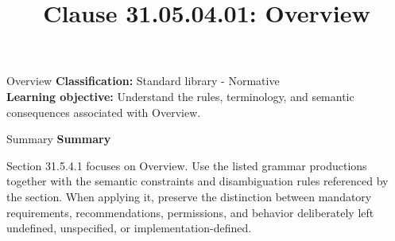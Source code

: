 \documentclass[10pt,letterpaper]{article}
\title{Clause 31.05.04.01: Overview}
\author{}
\date{}
\begin{document}
\maketitle
\begin{CornellOverviewBox}{Overview}
\textbf{Classification:} Standard library - Normative\\[2pt]
\textbf{Learning objective:} Understand the rules, terminology, and semantic consequences associated with Overview.
\end{CornellOverviewBox}\begin{CornellSummaryBox}{Summary}
{\sffamily\bfseries\color{Accent} Summary}\par\vspace{3pt}Section 31.5.4.1 focuses on Overview. Use the listed grammar productions together with the semantic constraints and disambiguation rules referenced by the section. When applying it, preserve the distinction between mandatory requirements, recommendations, permissions, and behavior deliberately left undefined, unspecified, or implementation-defined.
\end{CornellSummaryBox}
\end{document}
